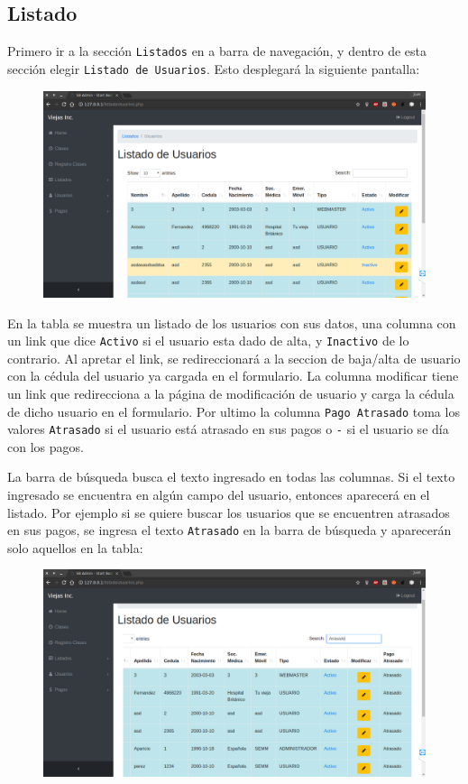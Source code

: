 \documentclass[a4paper, 12pt, spanish]{report}
\begin{document}
\subsection{Listado}
\par Primero ir a la sección \verb|Listados| en a barra de navegación, y dentro de esta sección elegir \verb|Listado de Usuarios|. Esto desplegará la siguiente pantalla:
\begin{figure}[H]
	\centering
	\includegraphics[width=\linewidth]{imagenes/us_list_comp}
	\label{fig:uslistcomp}
\end{figure}
\par En la tabla se muestra un listado de los usuarios con sus datos, una columna con un link que dice \verb|Activo| si el usuario esta dado de alta, y \verb|Inactivo| de lo contrario. Al apretar el link, se redireccionará a la seccion de baja/alta de usuario con la cédula del usuario ya cargada en el formulario. La columna modificar tiene un link que redirecciona a la página de modificación de usuario y carga la cédula de dicho usuario en el formulario. Por ultimo la columna \verb|Pago Atrasado| toma los valores \verb|Atrasado| si el usuario está atrasado en sus pagos o \verb|-| si el usuario se día con los pagos.
\par La barra de búsqueda busca el texto ingresado en todas las columnas. Si el texto ingresado se encuentra en algún campo del usuario, entonces aparecerá en el listado. Por ejemplo si se quiere buscar los usuarios que se encuentren atrasados en sus pagos, se ingresa el texto \verb|Atrasado| en la barra de búsqueda y aparecerán solo aquellos en la tabla:
\begin{figure}[H]
	\centering
	\includegraphics[width=\linewidth]{imagenes/us_list_atr}
	\label{fig:uslistatr}
\end{figure}
\end{document}
